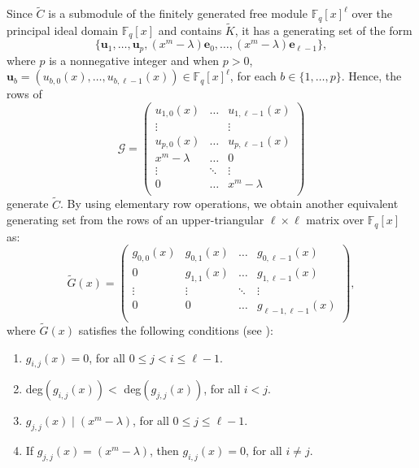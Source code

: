 \documentclass[11pt]{amsart}
\theoremstyle{plain}
\theoremstyle{definition}
\numberwithin{equation}{section}
\newcommand{\Fq}{\mathbb{F}_{q}}
\newcommand{\F}{{\mathbb F}}
\begin{document}
Since $\widetilde{C}$ is a submodule of the finitely generated free module $\F_q[x]^{\ell}$ over the principal ideal domain $\Fq[x]$ and contains $\widetilde{K}$, it has a generating set of the form $$\{\mathbf{u}_1,\ldots,\mathbf{u}_p, (x^m-\lambda)\mathbf{e}_0,\ldots,(x^m-\lambda)\mathbf{e}_{\ell-1}\},$$  where $p$ is a nonnegative integer and when $p>0$, $\mathbf{u}_b = (u_{b,0}(x),\ldots,u_{b,\ell-1}(x))\in \Fq[x]^{\ell}$, for each $b \in \{1,\ldots,p\}$. 
Hence, the rows of
$$\mathcal{G}=\left(\begin{array}{ccc}
    u_{1,0}(x) & \ldots & u_{1,\ell-1}(x) \\
    \vdots &  & \vdots \\
    u_{p,0}(x) & \ldots & u_{p,\ell-1}(x) \\
     x^m-\lambda & \ldots & 0 \\
    \vdots & \ddots & \vdots \\
    0 & \ldots & x^m-\lambda \\
  \end{array}
\right)$$
generate $\widetilde{C}$. By using elementary row operations, we obtain another equivalent generating set from the rows of an upper-triangular $\ell \times \ell$ matrix over $\Fq[x]$ as:
\begin{equation}\label{PGM}
\widetilde{G}(x)=\left(\begin{array}{cccc}
    g_{0,0}(x) & g_{0,1}(x) & \ldots & g_{0,\ell-1}(x) \\
    0 & g_{1,1}(x) & \ldots & g_{1,\ell-1}(x) \\
    \vdots & \vdots & \ddots & \vdots \\
    0 & 0 &\ldots & g_{\ell-1,\ell-1}(x)\\
  \end{array}
\right),
\end{equation}
where $\widetilde{G}(x)$ satisfies the following conditions (see \cite[Theorem 2.1]{LF}):
\begin{enumerate}
    \item $g_{i,j}(x)=0$, for all $0\leq j < i \leq \ell-1$.
    \item deg$(g_{i,j}(x)) < $ deg$(g_{j,j}(x))$, for all $i <j$.
    \item $g_{j,j}(x) \mid (x^m-\lambda)$, for all $0\leq j \leq \ell-1$.
    \item If  $g_{j,j}(x) = (x^m-\lambda)$, then $g_{i,j}(x) =0$, for all $i\neq j$.
\end{enumerate}
\end{document}
